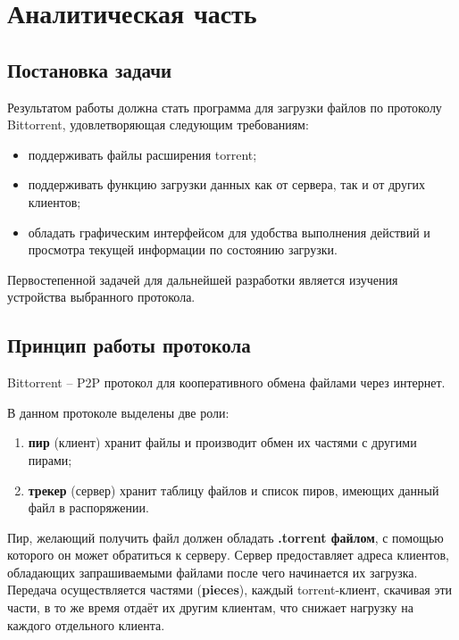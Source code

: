 \section{Аналитическая часть}

\subsection{Постановка задачи}
Результатом работы должна стать программа для загрузки файлов по протоколу Bittorrent, удовлетворяющая следующим требованиям:
\begin{itemize}
	\item поддерживать файлы расширения torrent;
	
	\item поддерживать функцию загрузки данных как от сервера, так и от других клиентов;
	
	\item обладать графическим интерфейсом для удобства выполнения действий и просмотра текущей информации по состоянию загрузки.
	
\end{itemize}

Первостепенной задачей для дальнейшей разработки является изучения устройства выбранного протокола. \newline

\subsection{Принцип работы протокола}
Bittorrent -- P2P протокол для кооперативного обмена файлами через интернет. 

В данном протоколе выделены две роли:
\begin{enumerate}
	\item \textbf{пир} (клиент) хранит файлы и производит обмен их частями с другими пирами;
	
	\item \textbf{трекер} (сервер) хранит таблицу файлов и список пиров, имеющих данный файл в распоряжении.
\end{enumerate}

Пир, желающий получить файл должен обладать \textbf{.torrent файлом}, с помощью которого он может обратиться к серверу. Сервер предоставляет адреса клиентов, обладающих запрашиваемыми файлами после чего начинается их загрузка. Передача осуществляется частями (\textbf{pieces}), каждый torrent-клиент, скачивая эти части, в то же время отдаёт их другим клиентам, что снижает нагрузку на каждого отдельного клиента. \newline

